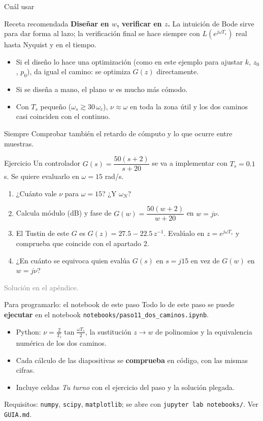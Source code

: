 \documentclass[aspectratio=169,11pt]{beamer}
\begin{document}
\begin{frame}{Cuál usar}
  \small
  \begin{block}{Receta recomendada}
    \textbf{Diseñar en $w$, verificar en $z$.} La intuición de Bode sirve para dar forma al lazo; la verificación final se hace siempre con $L(e^{j\omega T_s})$ real hasta Nyquist y en el tiempo.
  \end{block}
  \begin{itemize}
    \item Si el diseño lo hace una optimización (como en este ejemplo para ajustar $k$, $z_0$, $p_0$), da igual el camino: se optimiza $G(z)$ directamente.
    \item Si se diseña a mano, el plano $w$ es mucho más cómodo.
    \item Con $T_s$ pequeño ($\omega_s\gtrsim30\,\omega_c$), $\nu\approx\omega$ en toda la zona útil y los dos caminos casi coinciden con el continuo.
  \end{itemize}
  \begin{alertblock}{Siempre}
    Comprobar también el retardo de cómputo y lo que ocurre entre muestras.
  \end{alertblock}
\end{frame}

\begin{frame}{Ejercicio}
  \small
  Un controlador $G(s)=\dfrac{50(s+2)}{s+20}$ se va a implementar con $T_s=0.1$ s. Se quiere evaluarlo en $\omega=15$ rad/s.
  \begin{enumerate}
    \item ¿Cuánto vale $\nu$ para $\omega=15$? ¿Y $\omega_N$?
    \item Calcula módulo (dB) y fase de $G(w)=\dfrac{50(w+2)}{w+20}$ en $w=j\nu$.
    \item El Tustin de este $G$ es $G(z)=27.5-22.5\,z^{-1}$. Evalúalo en $z=e^{j\omega T_s}$ y comprueba que coincide con el apartado 2.
    \item ¿En cuánto se equivoca quien evalúa $G(s)$ en $s=j15$ en vez de $G(w)$ en $w=j\nu$?
  \end{enumerate}
  \textcolor{gray}{Solución en el apéndice.}
\end{frame}

\begin{frame}{Para programarlo: el notebook de este paso}
  \small
  Todo lo de este paso se puede \textbf{ejecutar} en el notebook \texttt{notebooks/paso11\_dos\_caminos.ipynb}.
  \begin{itemize}
    \item Python: $\nu=\frac{2}{T_s}\tan\frac{\omega T_s}{2}$, la sustitución $z\to w$ de polinomios y la equivalencia numérica de los dos caminos.
    \item Cada cálculo de las diapositivas se \textbf{comprueba} en código, con las mismas cifras.
    \item Incluye celdas \emph{Tu turno} con el ejercicio del paso y la solución plegada.
  \end{itemize}
  \footnotesize Requisitos: \texttt{numpy}, \texttt{scipy}, \texttt{matplotlib}; se abre con \texttt{jupyter lab notebooks/}. Ver \texttt{GUIA.md}.
\end{frame}
\end{document}
